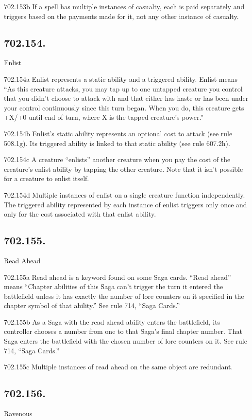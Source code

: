 702.153b If a spell has multiple instances of casualty, each is paid separately and triggers based on the payments made for it, not any other instance of casualty.

\subsection*{702.154.}
Enlist

702.154a Enlist represents a static ability and a triggered ability. Enlist means “As this creature attacks, you may tap up to one untapped creature you control that you didn’t choose to attack with and that either has haste or has been under your control continuously since this turn began. When you do, this creature gets +X/+0 until end of turn, where X is the tapped creature’s power.”

702.154b Enlist’s static ability represents an optional cost to attack (see rule 508.1g). Its triggered ability is linked to that static ability (see rule 607.2h).

702.154c A creature “enlists” another creature when you pay the cost of the creature’s enlist ability by tapping the other creature. Note that it isn’t possible for a creature to enlist itself.

702.154d Multiple instances of enlist on a single creature function independently. The triggered ability represented by each instance of enlist triggers only once and only for the cost associated with that enlist ability.

\subsection*{702.155.}
Read Ahead

702.155a Read ahead is a keyword found on some Saga cards. “Read ahead” means “Chapter abilities of this Saga can’t trigger the turn it entered the battlefield unless it has exactly the number of lore counters on it specified in the chapter symbol of that ability.” See rule 714, “Saga Cards.”

702.155b As a Saga with the read ahead ability enters the battlefield, its controller chooses a number from one to that Saga’s final chapter number. That Saga enters the battlefield with the chosen number of lore counters on it. See rule 714, “Saga Cards.”

702.155c Multiple instances of read ahead on the same object are redundant.

\subsection*{702.156.}
Ravenous


